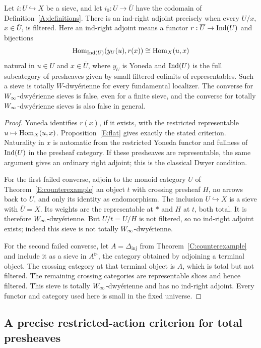 \begin{proposition}\label{E:ind-adjoint}
Let $i:U\hookrightarrow X$ be a sieve, and let $i_0:U\to\overline U$ have the codomain of Definition~\ref{A:definitions}. There is an ind-right adjoint precisely when every $U/x$, $x\in\overline U$, is filtered. Here an ind-right adjoint means a functor $r:\overline U\to\operatorname{Ind}(U)$ and bijections
\[
 \operatorname{Hom}_{\operatorname{Ind}(U)}(y_U(u),r(x))\cong\operatorname{Hom}_X(u,x)
\]
natural in $u\in U$ and $x\in\overline U$, where $y_U$ is Yoneda and $\operatorname{Ind}(U)$ is the full subcategory of presheaves given by small filtered colimits of representables. Such a sieve is totally $W$-dwy\'erienne for every fundamental localizer. The converse for $W_{\infty}$-dwy\'erienne sieves is false, even for a finite sieve, and the converse for totally $W_{\infty}$-dwy\'erienne sieves is also false in general.
\end{proposition}
\begin{proof}
Yoneda identifies $r(x)$, if it exists, with the restricted representable $u\mapsto\operatorname{Hom}_X(u,x)$. Proposition~\ref{E:flat} gives exactly the stated criterion. Naturality in $x$ is automatic from the restricted Yoneda functor and fullness of $\operatorname{Ind}(U)$ in the presheaf category. If these presheaves are representable, the same argument gives an ordinary right adjoint; this is the classical Dwyer condition.

For the first failed converse, adjoin to the monoid category $U$ of Theorem~\ref{E:counterexample} an object $t$ with crossing presheaf $H$, no arrows back to $U$, and only its identity as endomorphism. The inclusion $U\hookrightarrow X$ is a sieve with $\overline U=X$. Its weights are the representable at $*$ and $H$ at $t$, both total. It is therefore $W_{\infty}$-dwy\'erienne. But $U/t=U/H$ is not filtered, so no ind-right adjoint exists; indeed this sieve is not totally $W_{\infty}$-dwy\'erienne.

For the second failed converse, let $A=\Delta_{\mathrm{inj}}$ from Theorem~\ref{C:counterexample} and include it as a sieve in $A^{\triangleright}$, the category obtained by adjoining a terminal object. The crossing category at that terminal object is $A$, which is total but not filtered. The remaining crossing categories are representable slices and hence filtered. This sieve is totally $W_{\infty}$-dwy\'erienne and has no ind-right adjoint. Every functor and category used here is small in the fixed universe.
\end{proof}

\subsection{A precise restricted-action criterion for total presheaves}

